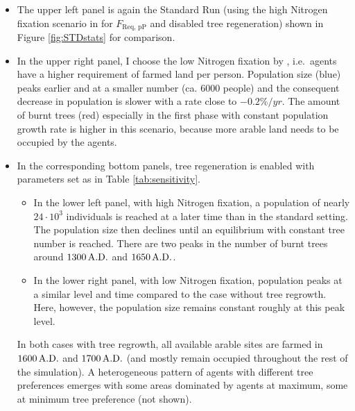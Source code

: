 \begin{itemize}
	\item The upper left panel is again the Standard Run (using the high Nitrogen fixation scenario in \citet{Puleston2017} for $F_\text{Req, pP}$ and disabled tree regeneration) shown in Figure \ref{fig:STDstats} for comparison.
	\item In the upper right panel, I choose the low Nitrogen fixation by  \citet{Puleston2017}, i.e.\ agents have a higher requirement of farmed land per person.
	Population size (blue) peaks earlier and at a smaller number (ca. $6000$ people) and the consequent decrease in population is slower with a rate close to $-0.2\%/yr$.
	The amount of burnt trees (red) especially in the first phase with constant population growth rate is higher in this scenario, because more arable land needs to be occupied by the agents.
	\item In the corresponding bottom panels, tree regeneration is enabled with parameters set as in Table \ref{tab:sensitivity}. 
	\begin{itemize}
		\item In the lower left panel, with high Nitrogen fixation, a population of nearly $24\cdot10^3$ individuals is reached at a later time than in the standard setting. The population size then declines until an equilibrium with constant tree number is reached.
		There are two peaks in the number of burnt trees around $1300\, {\rm A.D.}$ and $1650\, {\rm A.D.}$.
		\item In the lower right panel, with low Nitrogen fixation, population peaks at a similar level and time compared to the case without tree regrowth.
		Here, however, the population size remains constant roughly at this peak level.
	\end{itemize}
	In both cases with tree regrowth, all available arable sites are farmed in $1600\, {\rm A.D.}$ and $1700\, {\rm A.D.}$ (and mostly remain occupied throughout the rest of the simulation).	
	A heterogeneous pattern of agents with different tree preferences emerges with some areas dominated by agents at maximum, some at minimum tree preference (not shown).
\end{itemize}
